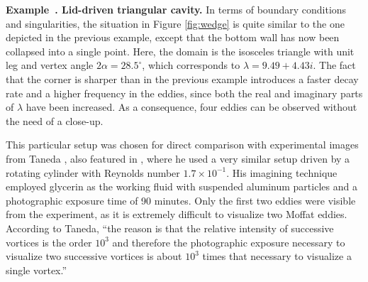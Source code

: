 \documentclass{article}
\newcounter{example}[section]
\newenvironment{example}[1][]{\refstepcounter{example}\par\medskip
	\textbf{Example~\theexample. #1} \rmfamily}{\medskip}
\begin{document}
\begin{example}[Lid-driven triangular cavity.]
\label{ex:triangle}
In terms of boundary conditions and singularities, the situation in Figure
\ref{fig:wedge} is quite similar to the one depicted in the previous
example, except that the bottom wall has now been collapsed into a single
point. Here, the domain is the isosceles triangle with unit leg and vertex
angle $2\alpha = 28.5^\circ$, which corresponds to $\lambda = 9.49 + 4.43i$.
The fact that the corner is sharper than in the previous example introduces
a faster decay rate and a higher frequency in the eddies, since both the
real and imaginary parts of $\lambda$ have been increased. As a consequence,
four eddies can be observed without the need of a close-up.

This particular setup was chosen for direct comparison with experimental images
from Taneda \cite[Fig.~19]{taneda79}, also featured in
\cite[Fig.~10]{vandyke82}, where he used a very similar setup driven by a
rotating cylinder with Reynolds number $1.7\times10^{-1}$. His imagining
technique employed glycerin as the working fluid with suspended aluminum
particles and a photographic exposure time of 90 minutes. Only the first two
eddies were visible from the experiment, as it is extremely difficult to
visualize two Moffat eddies. According to Taneda, ``the reason is that the
relative intensity of successive vortices is the order $10^3$ and therefore
the photographic exposure necessary to visualize two successive vortices is
about $10^3$ times that necessary to visualize a single vortex.''


\end{example}
\end{document}
